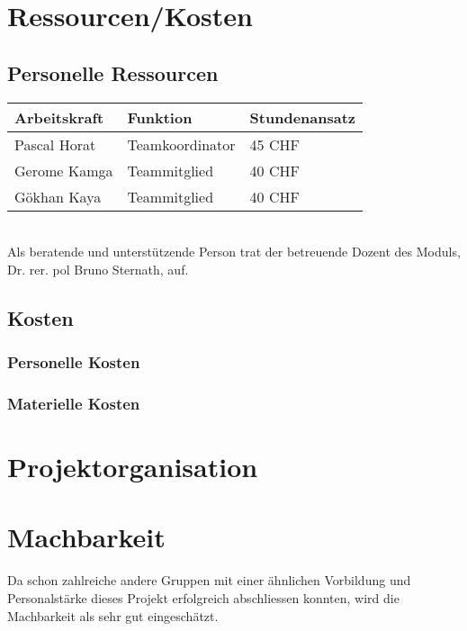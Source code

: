 \section{Ressourcen/Kosten}
\subsection{Personelle Ressourcen}
\begin{tabular}{| p{3cm} | p{4cm} | p{4cm} |}
\hline
\textbf{Arbeitskraft} & \textbf{Funktion} & \textbf{Stundenansatz} \\ \hline
Pascal Horat & Teamkoordinator & 45 CHF \\ \hline
Gerome Kamga & Teammitglied & 40 CHF \\ \hline
Gökhan Kaya & Teammitglied & 40 CHF \\ \hline

\end{tabular}\\

Als beratende und unterstützende Person trat der betreuende Dozent des Moduls, Dr. rer. pol Bruno Sternath, auf.

\subsection{Kosten}
\subsubsection{Personelle Kosten}
\subsubsection{Materielle Kosten}

\section{Projektorganisation}

\section{Machbarkeit}
Da schon zahlreiche andere Gruppen mit einer ähnlichen Vorbildung und Personalstärke dieses Projekt erfolgreich abschliessen konnten, wird die Machbarkeit als sehr gut eingeschätzt.